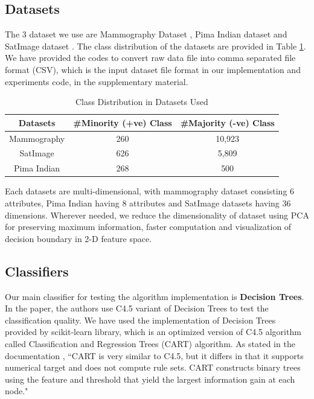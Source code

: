 \documentclass[10pt,journal,compsoc]{IEEEtran}
\begin{document}
\subsection{Datasets}
The 3 dataset we use are Mammography Dataset \cite{mammo}, Pima Indian dataset \cite{pima} and SatImage dataset \cite{satimg}.
The class distribution of the datasets are provided in Table \ref{tab:dataset}.
We have provided the codes to convert raw data file into comma separated file format (CSV), which is the input dataset file format in our implementation and experiments code, in the supplementary material. 

\begin{table}[!b]
    \centering
    \begin{tabular}{|c||c|c|}
    	\hline
         Datasets & \#Minority (+ve) Class & \#Majority (-ve) Class  \\ \hline \hline  
        Mammography & 260 & 10,923 \\ \hline
        SatImage & 626 & 5,809 \\ \hline 
        Pima Indian & 268 & 500 \\ \hline
    \end{tabular}
    \caption{Class Distribution in Datasets Used}
    \label{tab:dataset}
\end{table}
Each datasets are multi-dimensional, with mammography dataset consisting 6 attributes, Pima Indian having 8 attributes and SatImage datasets having 36 dimensions.
Wherever needed, we reduce the dimensionality of dataset using PCA for preserving maximum information, faster computation and visualization of decision boundary in 2-D feature space.

\subsection{Classifiers}
Our main classifier for testing the algorithm implementation is \textbf{Decision Trees}.
In the paper, the authors use C4.5 variant of Decision Trees to test the classification quality.
We have used the implementation of Decision Trees provided by scikit-learn library, which is an optimized version of C4.5 algorithm called Classification and Regression Trees (CART) algorithm.
As stated in the documentation \cite{dtree}, ``CART is very similar to C4.5, but it differs in that it supports numerical target and does not compute rule sets. 
CART constructs binary trees using the feature and threshold that yield the largest information gain at each node."
\end{document}
